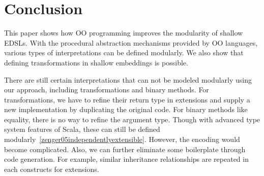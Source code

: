 \section{Conclusion}
This paper shows how OO programming improves the modularity of shallow EDSLs.
With the procedural abstraction mechanisms provided by OO languages, various types of
interpretations can be defined modularly. We also show that defining
transformations in shallow embeddings is possible.

There are still certain interpretations that can not be modeled modularly using
our approach, including transformations and binary methods.
For transformations, we have to refine their return type in extensions and
supply a new implementation by duplicating the original code.
For binary methods like equality, there is no way to refine the argument type.
Though with advanced type system features of Scala, these can still be defined
modularly~\ref{zenger05independentlyextensible}. However, the encoding would
become complicated.
Also, we can further eliminate some boilerplate through code generation.
For example, similar inheritance relationships are repeated in each constructs
for extensions.
